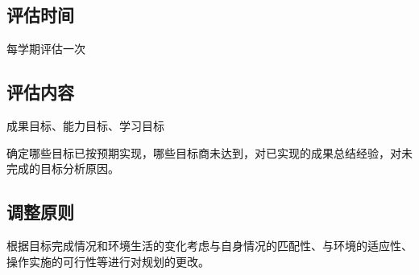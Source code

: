 \documentclass{article}
\begin{document}
\subsection{评估时间}
每学期评估一次\par
\subsection{评估内容}
成果目标、能力目标、学习目标\par
确定哪些目标已按预期实现，哪些目标商未达到，对已实现的成果总结经验，对未完成的目标分析原因。\par
\subsection{调整原则}
根据目标完成情况和环境生活的变化考虑与自身情况的匹配性、与环境的适应性、操作实施的可行性等进行对规划的更改。\par
\end{document}

